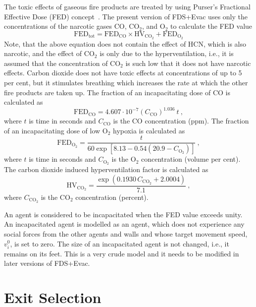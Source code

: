\documentclass[12pt,a4paper,final,twoside]{stylevk}
\begin{document}
The toxic effects of gaseous fire products are treated by using
Purser's Fractional Effective Dose (FED) concept~\cite{Purser95}.  The
present version of FDS+Evac uses only the concentrations of the
narcotic gases CO, CO${}_2$, and O${}_2$ to calculate the FED value
%
\begin{equation}
\mathrm{FED}_\mathrm{tot} = \mathrm{FED}_\mathrm{CO} \times
\mathrm{HV}_\mathrm{CO_2} + \mathrm{FED}_\mathrm{O_2} 
\end{equation}
%
Note, that the above equation does not contain the effect of HCN,
which is also narcotic, and the effect of CO${}_2$ is only due to the
hyperventilation, i.e., it is assumed that the concentration of
CO${}_2$ is such low that it does not have narcotic effects.  Carbon
dioxide does not have toxic effects at concentrations of up to 5
per cent, but it stimulates breathing which increases the rate at which
the other fire products are taken up.  The fraction of an
incapacitating dose of CO is calculated as
%
\begin{equation}
\mathrm{FED}_\mathrm{CO} = 4.607 \cdot 10^{-7} (C_\mathrm{CO})^{1.036}
\ t ~,
\end{equation}
%
where $t$ is time in seconds and $C_\mathrm{CO}$ is the CO
concentration (ppm).  The fraction of an incapacitating dose of low
O${}_2$ hypoxia is calculated as
%
\begin{equation}
\mathrm{FED}_\mathrm{O_2} =  \frac{t}{60 \exp \left [ 8.13-0.54 (20.9 -
  C_\mathrm{O_2}) \right ] } ~, 
\end{equation}
%
where $t$ is time in seconds and $C_\mathrm{O_2}$ is the O${}_2$
concentration (volume per cent).  The carbon dioxide induced
hyperventilation factor is calculated as
%
\begin{equation}
\mathrm{HV}_\mathrm{CO_2} = \frac{ \exp( 0.1930 \, C_\mathrm{CO_2} +
  2.0004 ) }{7.1} ~, 
\end{equation}
%
where $C_\mathrm{CO_2}$ is the CO${}_2$ concentration (percent).


An agent is considered to be incapacitated when the FED value exceeds
unity.  An incapacitated agent is modelled as an agent, which does not
experience any social forces from the other agents and walls and whose
target movement speed, $v^0_i$, is set to zero.  The size of an
incapacitated agent is not changed, i.e., it remains on its
feet.  This is a very crude model and it needs to be modified in later
versions of FDS+Evac.


\section{Exit Selection}\label{Sec_ExitSel}
\end{document}
